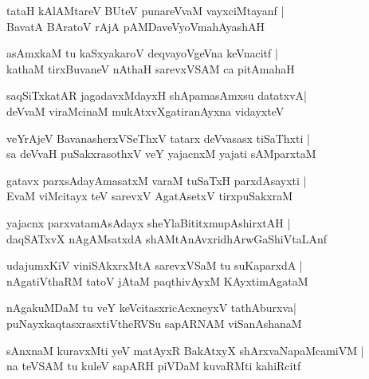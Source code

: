 \begin{shloka}
tataH kAlAMtareV BUteV punareVvaM vayxciMtayanf |\\ BavatA BAratoV rAjA pAMDaveVyoVmahAyashAH
\end{shloka}

\begin{shloka}
asAmxkaM tu kaSxyakaroV deqvayoVgeVna keVnacitf |\\ kathaM tirxBuvaneV nAthaH sarevxVSAM ca pitAmahaH
\end{shloka}

\begin{shloka}
saqSiTxkatAR jagadavxMdayxH shApamasAmxsu datatxvA\R |\\
deVvaM viraMcinaM mukAtxvXgatiranAyxna vidayxteV 
\end{shloka}

\begin{shloka}
veYrAjeV BavanasherxVSeThxV tatarx deVvasasx tiSaThxti |\\ sa deVvaH puSakxrasothxV veY yajacnxM yajati sAMparxtaM
\end{shloka}

\begin{shloka}
gatavx parxsAdayAmasatxM varaM tuSaTxH parxdAsayxti |\\ EvaM viMcitayx teV sarevxV AgatAsetxV tirxpuSakxraM 
\end{shloka}

\begin{shloka}
yajacnx parxvatamAsAdayx sheYlaBititxmupAshirxtAH |\\ daqSATxvX nAgAMsatxdA shAMtAnAvxridhArwGaShiVtaLAnf
\end{shloka}

\begin{shloka}
udajumxKiV viniSAkxrxMtA sarevxVSaM tu suKaparxdA |\\ nAgatiVthaRM tatoV jAtaM paqthivAyxM KAyxtimAgataM 
\end{shloka}

\begin{shloka}
nAgakuMDaM tu veY keVcitasxricAcxneyxV tathAburxva\R |\\ puNayxkaqtasxrasxtiVtheRVSu sapARNAM viSanAshanaM 
\end{shloka}

\begin{shloka}
sAnxnaM kuravxMti yeV matAyxR BakAtxyX shArxvaNapaMcamiVM |\\ 
na teVSAM tu kuleV sapARH piVDaM kuvaRMti kahiRcitf
\end{shloka}

